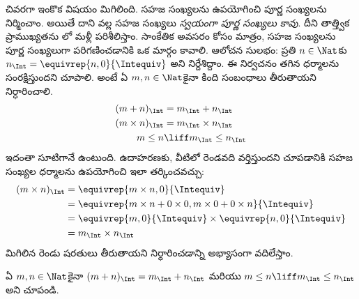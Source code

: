 \documentclass[../../../include/open-logic-section]{subfiles}
\begin{document}
చివరగా ఇంకొక విషయం మిగిలింది. సహజ సంఖ్యలను ఉపయోగించి పూర్ణ సంఖ్యలను
నిర్మించాం. అయితే దాని వల్ల సహజ సంఖ్యలు \emph{స్వయంగా పూర్ణ సంఖ్యలు
కావు}. దీని తాత్త్విక ప్రాముఖ్యతను లో మళ్లీ
పరిశీలిస్తాం. సాంకేతిక అవసరం కోసం మాత్రం, సహజ సంఖ్యలను పూర్ణ
సంఖ్యలుగా పరిగణించడానికి ఒక మార్గం కావాలి. ఆలోచన సులభం: ప్రతి
$n \in \Nat$కు $n_\Int = \equivrep{n, 0}{\Intequiv}$ అని
నిర్దేశిద్దాం. ఈ నిర్వచనం తగిన ధర్మాలను సంరక్షిస్తుందని చూపాలి. అంటే ఏ
$m, n \in \Nat$కైనా కింది సంబంధాలు తీరుతాయని నిర్ధారించాలి.
\begin{align*}
	(m + n)_\Int &= m_\Int + n_\Int\\
	(m \times n)_\Int &= m_\Int \times n_\Int\\
	m \leq n &\liff m_\Int \leq n_\Int
\end{align*}
ఇదంతా సూటిగానే ఉంటుంది. ఉదాహరణకు, వీటిలో రెండవది వర్తిస్తుందని
చూపడానికి సహజ సంఖ్యల ధర్మాలను ఉపయోగించి ఇలా తర్కించవచ్చు:
	\begin{align*}
		(m \times n)_\Int  &= \equivrep{m \times n, 0}{\Intequiv} \\
		&= \equivrep{m \times n + 0 \times 0, m \times 0 + 0 \times n}{\Intequiv} \\
		&= \equivrep{m, 0}{\Intequiv} \times \equivrep{n, 0}{\Intequiv} \\
		&= m_\Int \times n_\Int
	\end{align*}
మిగిలిన రెండు షరతులు తీరుతాయని నిర్ధారించడాన్ని అభ్యాసంగా
వదిలేస్తాం.
\begin{prob}
	ఏ $m, n \in \Nat$కైనా $(m + n)_\Int = m_\Int + n_\Int$ మరియు
$m \leq n \liff m_\Int \leq n_\Int$ అని చూపండి.
\end{prob}
\end{document}
